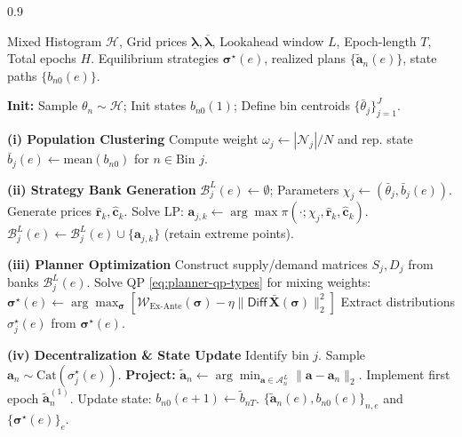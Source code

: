 \documentclass[12pt, notitlepage]{article}
\begin{document}
\begin{algorithm}[h!]
\caption{Rolling-Horizon Equilibrium Solver}
\label{alg:equilibrium_computation}
\small %
\begin{spacing}{0.9} %
\begin{algorithmic}[1]
\Require Mixed Histogram $\mathcal{H}$, Grid prices $\underline{\boldsymbol{\lambda}}, \overline{\boldsymbol{\lambda}}$, Lookahead window $L$, Epoch-length $T$, Total epochs $H$.
\Ensure Equilibrium strategies $\boldsymbol{\sigma}^\star(e)$, realized plans $\{\widetilde{\mathbf{a}}_n(e)\}$, state paths $\{b_{n0}(e)\}$.

\State \textbf{Init:} Sample $\theta_n \sim \mathcal{H}$; Init states $b_{n0}(1)$; Define bin centroids $\{\bar{\theta}_j\}_{j=1}^J$.

 
    \State \textbf{(i) Population Clustering}
        \State Compute weight $\omega_j \gets |\mathcal{N}_j| / N$ and rep. state $\bar{b}_j(e) \gets \text{mean}(b_{n0})$ for $n \in \text{Bin } j$.
    \EndFor

    \State \textbf{(ii) Strategy Bank Generation} 
        \State $\mathcal{B}_j^L(e) \gets \emptyset$; Parameters $\chi_j \gets (\bar{\theta}_j, \bar{b}_j(e))$.
            \State Generate prices $\hat{\mathbf{r}}_k, \hat{\mathbf{c}}_k$. Solve LP: $\mathbf{a}_{j,k} \gets \arg\max \pi(\cdot; \chi_j, \hat{\mathbf{r}}_k, \hat{\mathbf{c}}_k)$.
            \State $\mathcal{B}_j^L(e) \gets \mathcal{B}_j^L(e) \cup \{ \mathbf{a}_{j,k} \}$ (retain extreme points).
        \EndFor
    \EndFor

    \State \textbf{(iii) Planner Optimization}
    \State Construct supply/demand matrices $S_j, D_j$ from banks $\mathcal{B}_j^L(e)$.
    \State Solve QP \eqref{eq:planner-qp-types} for mixing weights:
    \State \quad $\boldsymbol{\sigma}^\star(e) \gets \arg\max_{\boldsymbol{\sigma}} [ \mathcal{W}_{\text{Ex-Ante}}(\boldsymbol{\sigma}) - \eta \|\textsf{Diff}\, \bar{\mathbf{X}}(\boldsymbol{\sigma})\|_2^2 ]$
    \State Extract distributions $\sigma_j^\star(e)$ from $\boldsymbol{\sigma}^\star(e)$.

    \State \textbf{(iv) Decentralization \& State Update} 
        \State Identify bin $j$. Sample $\mathbf{a}_{n} \sim \text{Cat}(\sigma_j^\star(e))$.
        \State \textbf{Project:} $\widetilde{\mathbf{a}}_n \gets \arg\min_{\mathbf{a} \in \mathcal{A}_n^L} \|\mathbf{a} - \mathbf{a}_{n}\|_2$.
        \State Implement first epoch $\widetilde{\mathbf{a}}_n^{(1)}$. Update state: $b_{n0}(e+1) \gets \widetilde{b}_{nT}$.
    \EndFor
\EndFor
\State \Return $\{\widetilde{\mathbf{a}}_n(e), b_{n0}(e)\}_{n,e}$ and $\{\boldsymbol{\sigma}^\star(e)\}_e$.
\end{algorithmic}
\end{spacing}
\end{algorithm}
\end{document}
